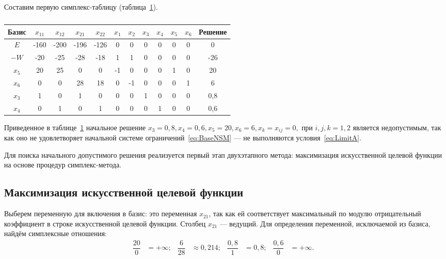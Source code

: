 Составим первую симплекс-таблицу (таблица~\ref{tbl:Simplex1_1}).

\renewcommand{\tabcolsep}{0.55em}
\begin{table}[h]
  \centering
    \caption{\label{tbl:Simplex1_1}}
    \begin{tabular}{|c|c|c|c|c|c|c|c|c|c|c|c|}
      \hline
      Базис & $ x_{11} $ & $ x_{12} $ & $ x_{21} $ & $ x_{22} $ & $ x_{1} $ & $ x_{2} $ & $ x_{3} $ & $ x_{4} $ & $ x_{5} $ & $ x_{6} $ & Решение \\  
      \hline
      $ E $ & -160 & -200 & -196 & -126 & 0 & 0 & 0 & 0 & 0 & 0 & 0 \\  
      \hline
      $ -W $ & -20 & -25 & -28 & -18 & 1 & 1 & 0 & 0 & 0 & 0 & -26 \\  
      \hline
      $ x_{5} $ & 20 & 25 & 0 & 0 & -1 & 0 & 0 & 0 & 1 & 0 & 20 \\  
      \hline
      $ x_{6} $ & 0 & 0 & 28 & 18 & 0 & -1 & 0 & 0 & 0 & 1 & 6 \\  
      \hline
      $ x_{3} $ & 1 & 0 & 1 & 0 & 0 & 0 & 1 & 0  & 0 & 0 & 0{,}8 \\  
      \hline
      $ x_{4} $ & 0 & 1 & 0 & 1 & 0 & 0 & 0 & 1 & 0 & 0 & 0{,}6 \\  
      \hline
    \end{tabular}
\end{table}

Приведенное в таблице~\ref{tbl:Simplex1_1} начальное решение
$ x_{3} = 0{,}8, x_{4} = 0{,}6, x_{5} = 20, x_{6} = 6, x_{k} = x_{ij} = 0, $ при $ i,j,k=1{,}2 $
является недопустимым, так как оно не удовлетворяет начальной системе ограничений~\eqref{eq:BaseNSM} --- не выполняются условия~\eqref{eq:LimitA}.

Для поиска начального допустимого решения реализуется первый этап двухэтапного метода:
максимизация искусственной целевой функции на основе процедур симплекс-метода.

\subsection{Максимизация искусственной целевой функции}

Выберем переменную для включения в базис: это переменная $ x_{21} $, так как
ей соответствует максимальный по модулю отрицательный коэффициент в
строке искусственной целевой функции. Столбец $ x_{21} $ --- ведущий.
Для определения переменной, исключаемой из базиса, найдём
симплексные отношения:
\begin{align}
  \dfrac{20}{0} & = +\infty; &
  \dfrac{6}{28} & \approx 0{,}214; &
  \dfrac{0{,}8}{1} & = 0{,}8; &
  \dfrac{0{,}6}{0} & = +\infty.
\end{align}

